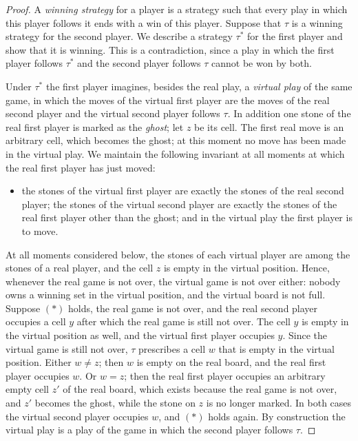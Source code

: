 \begin{proof}
A \emph{winning strategy} for a player is a strategy such that every play in which this player follows it
ends with a win of this player. Suppose that $\tau$ is a winning strategy for the second player. We describe
a strategy $\tau^*$ for the first player and show that it is winning. This is a contradiction, since a play in
which the first player follows $\tau^*$ and the second player follows $\tau$ cannot be won by both.

Under $\tau^*$ the first player imagines, besides the real play, a \emph{virtual play} of the same game, in
which the moves of the virtual first player are the moves of the real second player and the virtual second
player follows $\tau$. In addition one stone of the real first player is marked as the \emph{ghost}; let $z$
be its cell. The first real move is an arbitrary cell, which becomes the ghost; at this moment no move has
been made in the virtual play. We maintain the following invariant at all moments at which the real first
player has just moved:
\begin{itemize}[leftmargin=2.2em]
\item[$(\ast)$] the stones of the virtual first player are exactly the stones of the real second player; the
  stones of the virtual second player are exactly the stones of the real first player other than the ghost;
  and in the virtual play the first player is to move.
\end{itemize}
At all moments considered below, the stones of each virtual player are among the stones of a real player,
and the cell $z$ is empty in the virtual position. Hence, whenever the real game is not over, the virtual
game is not over either: nobody owns a winning set in the virtual position, and the virtual board is not
full. Suppose $(\ast)$ holds, the real game is not over, and the real second player
occupies a cell $y$ after which the real game is still not over. The cell $y$ is empty in the virtual
position as well, and the virtual first player occupies $y$. Since the virtual game is still not over,
$\tau$ prescribes a cell $w$ that is empty in the virtual position.
Either $w\ne z$; then $w$ is empty on the real board, and the real first player occupies $w$. Or $w=z$; then
the real first player occupies an arbitrary empty cell $z'$ of the real board, which exists because the real
game is not over, and $z'$ becomes the ghost, while the stone on $z$ is no longer marked. In both cases the
virtual second player occupies $w$, and $(\ast)$ holds again. By construction the virtual play is a play of the
game in which the second player follows $\tau$.


\end{proof}
